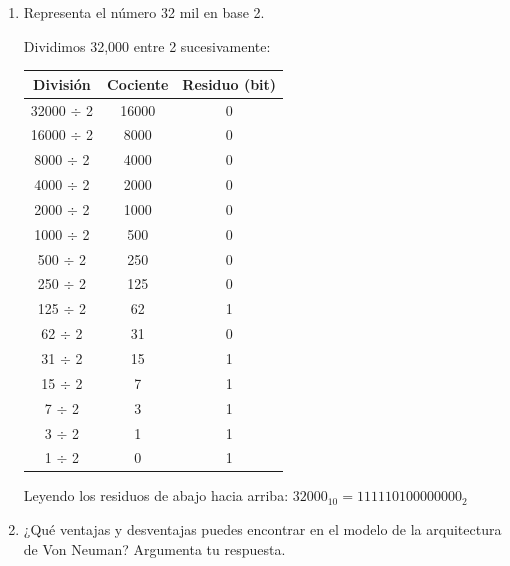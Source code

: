 \documentclass[12pt,letterpaper]{article}
\begin{document}
\begin{enumerate}
  \item Representa el número 32 mil en base 2.
    
    \bigskip

    Dividimos 32,000 entre 2 sucesivamente:

    \begin{table}[H]
      \begin{center}
        \begin{tabular}{| c | c | c |}
          
          \hline
          
          \textbf{Divisi\'{o}n} & \textbf{Cociente} & \textbf{Residuo (bit)} \\ \hline
          32000 $\div$ 2 & 16000 & 0 \\ \hline
          16000 $\div$ 2 & 8000  & 0 \\ \hline
          8000  $\div$ 2 & 4000  & 0 \\ \hline
          4000  $\div$ 2 & 2000  & 0 \\ \hline
          2000  $\div$ 2 & 1000  & 0 \\ \hline
          1000  $\div$ 2 & 500   & 0 \\ \hline
          500   $\div$ 2 & 250   & 0 \\ \hline
          250   $\div$ 2 & 125   & 0 \\ \hline
          125   $\div$ 2 & 62    & 1 \\ \hline
          62    $\div$ 2 & 31    & 0 \\ \hline
          31    $\div$ 2 & 15    & 1 \\ \hline
          15    $\div$ 2 & 7     & 1 \\ \hline
          7     $\div$ 2 & 3     & 1 \\ \hline
          3     $\div$ 2 & 1     & 1 \\ \hline
          1     $\div$ 2 & 0     & 1 \\ \hline
        \end{tabular}
      \end{center}
    \end{table}

    
    Leyendo los residuos de abajo hacia arriba: $32000_{10} = 111110100000000_2$
    \bigskip
    
  \item ¿Qué ventajas y desventajas puedes encontrar en el modelo de la arquitectura de Von Neuman? Argumenta tu respuesta.
    

\end{enumerate}
\end{document}
